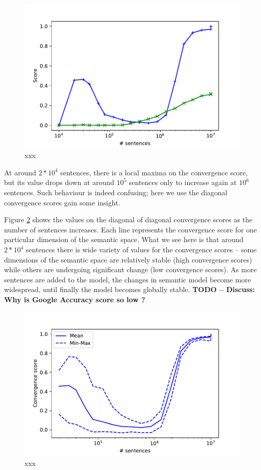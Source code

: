\documentclass{article} %
\begin{document}
\begin{figure}
 \includegraphics[width=\textwidth]{scoresVsNoSentences.pdf} 
 \caption{xxx}
 \label{fig:scores}
\end{figure}

At around $2 * 10^4$ sentences, there is a local maxima on the convergence score, but its value drops down at around $10^5$ sentences only to increase again at $10^6$ sentences. Such behaviour is indeed confusing; here we use the diagonal convergence scores gain some insight.

Figure \ref{fig:spreadDiagonal} shows the values on the diagonal of diagonal convergence scores as the number of sentences increases. Each line represents the convergence score for one particular dimension of the semantic space. What we see here is that around $2 * 10^4$ sentences there is wide variety of values for the convergence scores -- some dimensions of the semantic space are relatively stable (high convergence scores) while others are undergoing significant change (low convergence scores). As more sentences are added to the model, the changes in semantic model become more widespread, until finally the model becomes globally stable. \textbf{TODO -- Discuss: Why is Google Accuracy score so low ?}

\begin{figure}
 \includegraphics[width=\textwidth]{spreadDiagonalValues.pdf} 
 \caption{xxx}
 \label{fig:spreadDiagonal}
\end{figure}
\end{document}
